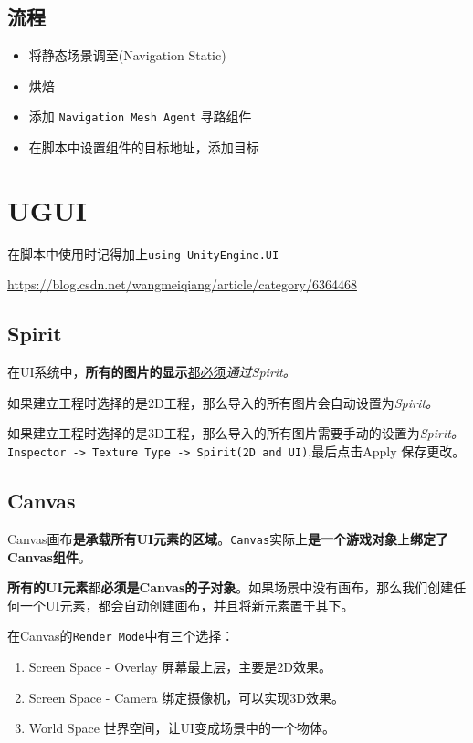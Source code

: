 \documentclass[UTF8,a4paper,12pt]{ctexbook}
\begin{document}
	\section{流程}
		\begin{itemize}
			\item 将静态场景调至(Navigation Static)
			\item 烘焙
			\item 添加 \verb|Navigation Mesh Agent| 寻路组件
			\item 在脚本中设置组件的目标地址，添加目标
		\end{itemize}
	
\chapter{UGUI}
	在脚本中使用时记得加上\verb|using UnityEngine.UI |
	
	\url{https://blog.csdn.net/wangmeiqiang/article/category/6364468}
	
	\section{Spirit}
		在UI系统中，\textbf{所有的图片的显示}\underline{都必须}\textit{通过Spirit。}
		
		如果建立工程时选择的是2D工程，那么导入的所有图片会自动设置为\textit{Spirit。}
		
		如果建立工程时选择的是3D工程，那么导入的所有图片需要手动的设置为\textit{Spirit。}\verb|Inspector -> Texture Type -> Spirit(2D and UI)|,最后点击Apply 保存更改。
	
	\section{Canvas}
		Canvas画布\textbf{是承载所有UI元素的区域}。\verb|Canvas|实际上\textbf{是一个游戏对象}上\textbf{绑定了Canvas组件}。
		
		\textbf{所有的UI元素}都\textbf{必须是Canvas的子对象}。如果场景中没有画布，那么我们创建任何一个UI元素，都会自动创建画布，并且将新元素置于其下。
		
		在Canvas的\verb|Render Mode|中有三个选择：
			\begin{enumerate}[itemindent = 1em]
				\item Screen Space - Overlay 屏幕最上层，主要是2D效果。
				\item Screen Space - Camera 绑定摄像机，可以实现3D效果。
				\item World Space 世界空间，让UI变成场景中的一个物体。
			\end{enumerate}
	
\end{document}
